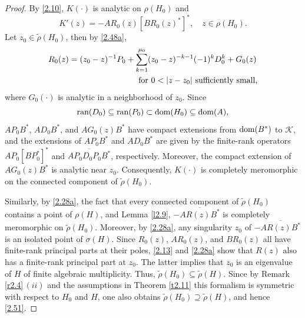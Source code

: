 \documentclass[reqno,10pt, centertags]{amsart}
\newcommand{\cK}{{\mathcal K}}
\newcommand{\lb}{\label}
\newcommand{\ol}{\overline}
\newcommand{\wti}{\widetilde}
\newcommand{\ran}{\text{\rm{ran}}}
\newcommand{\dom}{\text{\rm{dom}}}
\numberwithin{equation}{section}
\theoremstyle{definition}
\begin{document}
\begin{proof}
By \eqref{2.10}, $K(\cdot)$ is analytic on $\rho(H_0)$ and
\begin{equation}
K'(z)=-AR_0(z)[BR_0(z)^*]^*, \quad z\in\rho(H_0). \lb{2.63}
\end{equation}
Let $z_0\in\wti \rho (H_0)$, then by \eqref{2.48a},
\begin{align}
\begin{split} 
& R_0(z)=(z_0-z)^{-1}P_0 +
\sum_{k=1}^{\mu_0} (z_0-z)^{-k-1}(-1)^k D_0^k + G_0(z) \lb{2.53} \\
& \hspace*{3.85cm} \text{for $0 < |z - z_0|$ sufficiently small,} 
\end{split}
\end{align}
where $G_0(\cdot)$ is analytic in a neighborhood of $z_0$. Since
\begin{equation}
\ran(D_0)\subseteq\ran(P_0)\subset\dom(H_0)\subseteq \dom(A),
\lb{2.54}
\end{equation}
$AP_0B^*$, $AD_0B^*$, and $AG_0(z)B^*$ have compact extensions from
$\dom(B^*)$ to $\cK$, and the extensions of $AP_0B^*$ and $AD_0B^*$
are given by the finite-rank operators $AP_0[BP_0^*]^*$ and
$\ol{AP_0D_0P_0B^*}$, respectively. Moreover, 
the compact extension of $AG_0(z)B^*$ is analytic near $z_0$. Consequently,
$K(\cdot)$ is completely meromorphic on the connected component of $\wti \rho (H_0)$.

Similarly, by \eqref{2.28a}, the fact that every connected component of $\widetilde \rho(H_0)$ 
contains a point of $\rho(H)$, and Lemma \ref{l2.9}, $-\ol{AR(z)B^*}$
is completely meromorphic on $\wti \rho (H_0)$. Moreover, by
\eqref{2.28a}, any singularity $z_0$ of $-\ol{AR(z)B^*}$ is an
isolated point of $\sigma(H)$. Since $R_0(z)$, $AR_0(z)$, and
$BR_0(z)$ all have finite-rank principal parts at their poles,
\eqref{2.13} and \eqref{2.28a} show that $R(z)$ also has a
finite-rank principal part at $z_0$. The latter implies that $z_0$ is an
eigenvalue of $H$ of finite algebraic multiplicity. Thus,
$\wti \rho (H_0)\subseteq\wti \rho (H)$. Since by Remark \ref{r2.4}\,$(ii)$ and the assumptions 
in Theorem \ref{t2.11} this formalism is symmetric with respect to $H_0$ and
$H$, one also obtains $\wti \rho (H_0)\supseteq\wti \rho (H)$, and
hence \eqref{2.51}. 


\end{proof}
\end{document}
